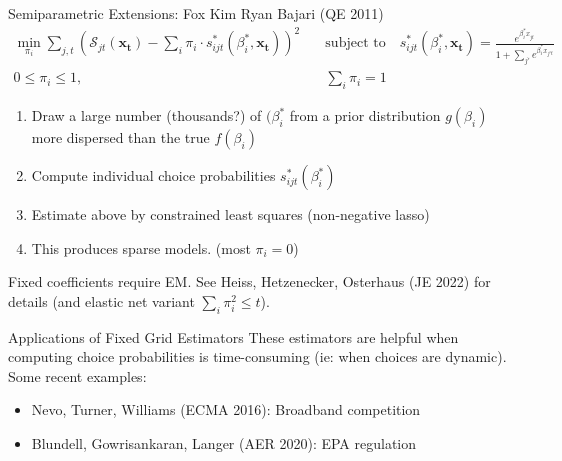 \begin{frame}{Semiparametric Extensions: Fox Kim Ryan Bajari (QE 2011)}
\vspace{-0.5cm}
\begin{align*}
\nonumber \min_{\pi_i} \sum_{j,t} \left(\mathcal{S}_{jt}(\mathbf{x_t}) - \sum_i \pi_i \cdot s^{*}_{ijt}(\beta^{*}_i, \mathbf{x_t})\right)^2 &
\quad \text{subject to} \quad s^{*}_{ijt}(\beta^{*}_i, \mathbf{x_t}) = \frac{e^{\beta^{*}_i x_{jt} }}{1+\sum_{j'}e^{\beta^{*}_i x_{j't}}}\\
   0\leq  \pi_i \leq 1,& \quad   \sum_i \pi_i = 1
\end{align*}
\vspace{-0.5cm}
\begin{enumerate} 
    \item Draw a large number (thousands?) of $(\beta^{*}_i$ from a prior distribution $g(\beta_i)$ more dispersed than the true $f(\beta_i)$
    \item Compute individual choice probabilities $ s^{*}_{ijt}(\beta^{*}_i)$
    \item Estimate above by constrained least squares (non-negative lasso)
    \item This produces sparse models. (most $\pi_i=0$)
\end{enumerate}
Fixed coefficients require EM. See Heiss, Hetzenecker, Osterhaus (JE 2022) for details (and elastic net variant $\sum_i \pi_i^2 \leq t$).
\end{frame}


\begin{frame}{Applications of Fixed Grid Estimators}
These estimators are helpful when computing choice probabilities is time-consuming (ie: when choices are dynamic). Some recent examples:
\begin{itemize}
    \item Nevo, Turner, Williams (ECMA 2016): Broadband competition
    \item Blundell, Gowrisankaran, Langer (AER 2020): EPA regulation
\end{itemize}
\end{frame}










